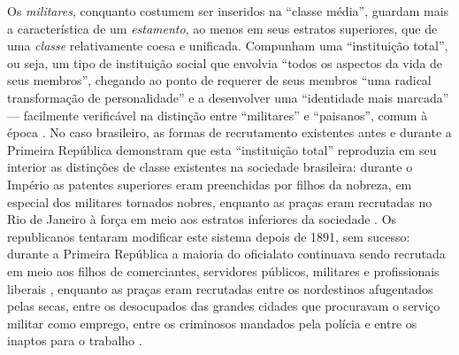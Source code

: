 Os \textit{militares}, conquanto costumem ser inseridos na ``classe média'', guardam mais a característica de um \textit{estamento}, ao menos em seus estratos superiores, que de uma \textit{classe} relativamente coesa e unificada. Compunham uma ``instituição total'', ou seja, um tipo de instituição social que envolvia ``todos os aspectos da vida de seus membros'', chegando ao ponto de requerer de seus membros ``uma radical transformação de personalidade'' e a desenvolver uma ``identidade mais marcada'' --- facilmente verificável na distinção entre ``militares'' e ``paisanos'', comum à época \cite[p.~181]{carvalho_militares_1977}. No caso brasileiro, as formas de recrutamento existentes antes e durante a Primeira República demonstram que esta ``instituição total'' reproduzia em seu interior as distinções de classe existentes na sociedade brasileira: durante o Império as patentes superiores eram preenchidas por filhos da nobreza, em especial dos militares tornados nobres, enquanto as praças eram recrutadas no Rio de Janeiro à força em meio aos estratos inferiores da sociedade \cite[pp.~186-192]{carvalho_militares_1977}. Os republicanos tentaram modificar este sistema depois de 1891, sem sucesso: durante a Primeira República a maioria do oficialato continuava sendo recrutada em meio aos filhos de comerciantes, servidores públicos, militares e profissionais liberais \cite[p.~188]{carvalho_militares_1977}, enquanto as praças eram recrutadas entre os nordestinos afugentados pelas secas, entre os desocupados das grandes cidades que procuravam o serviço militar como emprego, entre os criminosos mandados pela polícia e entre os inaptos para o trabalho \cite[p.~190]{carvalho_militares_1977}. 

